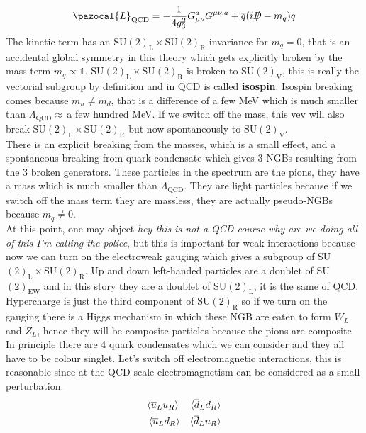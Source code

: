 \documentclass[../main.tex]{subfiles}
\begin{document}
\[
\pazocal{L}_{\text{QCD}}=-\frac{1}{4g_3^2}G_{\mu\nu}^aG^{\mu\nu,a}+\overline{q}(i\slashed{D}-m_q)q
\]
The kinetic term has an SU$(2)_{\text{L}}\times$SU$(2)_{\text{R}}$ invariance for $m_q=0$, that is an accidental global symmetry in this theory which gets explicitly broken by the mass term $m_q\propto\mathbb{1}$. SU$(2)_{\text{L}}\times$SU$(2)_{\text{R}}$ is broken to SU$(2)_{\text{V}}$, this is really the vectorial subgroup by definition and in QCD is called \textbf{isospin}. Isospin breaking comes because $m_u\neq m_d$, that is a difference of a few MeV which is much smaller than $\Lambda_{\text{QCD}}\approx$\,a few hundred MeV. If we switch off the mass, this vev will also break SU$(2)_{\text{L}}\times$SU$(2)_{\text{R}}$ but now spontaneously to SU$(2)_{\text{V}}$.\\
There is an explicit breaking from the masses, which is a small effect, and a spontaneous breaking from quark condensate which gives 3 NGBs resulting from the 3 broken generators. These particles in the spectrum are the pions, they have a mass which is much smaller than $\Lambda_{\text{QCD}}$. They are light particles because if we switch off the mass term they are massless, they are actually pseudo-NGBs because $m_q\neq0$.\\
At this point, one may object \textit{hey this is not a QCD course why are we doing all of this I'm calling the police}, but this is important for weak interactions because now we can turn on the electroweak gauging which gives a subgroup of SU$(2)_{\text{L}}\times$SU$(2)_{\text{R}}$. Up and down left-handed particles are a doublet of SU$(2)_{\text{EW}}$ and in this story they are a doublet of SU$(2)_{\text{L}}$, it is the same of QCD. Hypercharge is just the third component of SU$(2)_{\text{R}}$ so if we turn on the gauging there is a Higgs mechanism in which these NGB are eaten to form $W_L$ and $Z_L$, hence they will be composite particles because the pions are composite.\\
In principle there are 4 quark condensates which we can consider and they all have to be colour singlet. Let's switch off electromagnetic interactions, this is reasonable since at the QCD scale electromagnetism can be considered as a small perturbation. 
\[
\begin{aligned}
    &\langle\overline{u}_Lu_R\rangle &\langle\overline{d}_Ld_R\rangle\\
    &\Braket{\overline{u}_Ld_R} &\langle\overline{d}_Lu_R\rangle
\end{aligned}
\]
\end{document}
